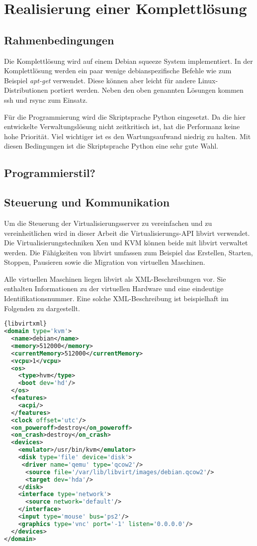\section{Realisierung einer Komplettlösung}
\subsection{Rahmenbedingungen}
Die Komplettlösung wird auf einem Debian squeeze System implementiert. In der Komplettlösung werden ein paar wenige debianspezifische Befehle wie zum Beispiel \textit{apt-get} verwendet. Diese können aber leicht für andere Linux-Distributionen portiert werden. Neben den oben genannten Lösungen kommen ssh und rsync zum Einsatz.

Für die Programmierung wird die Skriptsprache Python eingesetzt. Da die hier entwickelte Verwaltungslösung nicht zeitkritisch ist, hat die Performanz keine hohe Priorität. Viel wichtiger ist es den Wartungsaufwand niedrig zu halten. Mit diesen Bedingungen ist die Skriptsprache Python eine sehr gute Wahl.

\subsection{Programmierstil?}

\subsection{Steuerung und Kommunikation}
Um die Steuerung der Virtualisierungsserver zu vereinfachen und zu vereinheitlichen wird in dieser Arbeit die Virtualisierungs-API libvirt verwendet. Die Virtualisierungstechniken Xen und KVM können beide mit libvirt verwaltet werden. Die Fähigkeiten von libvirt umfassen zum Beispiel das Erstellen, Starten, Stoppen, Pausieren sowie die Migration von virtuellen Maschinen. 

Alle virtuellen Maschinen liegen libvirt als XML-Beschreibungen vor. Sie enthalten Informationen zu der virtuellen Hardware und eine eindeutige Identifikationsnummer. Eine solche XML-Beschreibung ist beispielhaft im Folgenden zu dargestellt.
\\
\begin{lstlisting}[caption=libvirt-XML Beispiel,language=XML,label=libvirtxml]{libvirtxml}
<domain type='kvm'>
  <name>debian</name>
  <memory>512000</memory>
  <currentMemory>512000</currentMemory>
  <vcpu>1</vcpu>
  <os>
    <type>hvm</type>
    <boot dev='hd'/>
  </os>
  <features>
    <acpi/>
  </features>
  <clock offset='utc'/>
  <on_poweroff>destroy</on_poweroff>
  <on_crash>destroy</on_crash>
  <devices>
    <emulator>/usr/bin/kvm</emulator>
    <disk type='file' device='disk'>
     <driver name='qemu' type='qcow2'/>
      <source file='/var/lib/libvirt/images/debian.qcow2'/>
      <target dev='hda'/>
    </disk>
    <interface type='network'>
      <source network='default'/>
    </interface>
    <input type='mouse' bus='ps2'/>
    <graphics type='vnc' port='-1' listen='0.0.0.0'/>
  </devices>
</domain>
\end{lstlisting}

